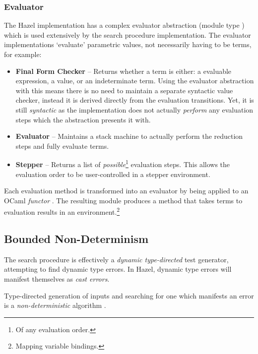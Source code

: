\subsubsection{Evaluator}\label{sec:HazelEvaluator}
The Hazel implementation has a complex evaluator abstraction (module type ) which is used extensively by the search procedure implementation. The evaluator implementations `evaluate' parametric values, not necessarily having to be terms, for example:
\begin{itemize}
\item \textbf{Final Form Checker} -- Returns whether a term is either: a evaluable expression, a value, or an indeterminate term. Using the evaluator abstraction with this means there is no need to maintain a separate syntactic value checker, instead it is derived directly from the evaluation transitions. Yet, it is still \textit{syntactic} as the implementation does not actually \textit{perform} any evaluation steps which the abstraction presents it with.
\item \textbf{Evaluator} -- Maintains a stack machine to actually perform the reduction steps and fully evaluate terms.
\item \textbf{Stepper} -- Returns a list of \textit{possible}\footnote{Of any evaluation order.} evaluation steps. This allows the evaluation order to be user-controlled in a stepper environment.
\end{itemize}
Each evaluation method is transformed into an evaluator by being applied to an OCaml \textit{functor} \cite[ch. 10]{RealWorldOCaml}. The resulting module produces a  method that takes terms to evaluation results in an environment.\footnote{Mapping variable bindings.}


\subsection{Bounded Non-Determinism}\label{sec:Nondeterminism}
The search procedure \cite{SearchProc} is effectively a \textit{dynamic type-directed} test generator, attempting to find dynamic type errors. In Hazel, dynamic type errors will manifest themselves as \textit{cast errors}.

Type-directed generation of inputs and searching for one which manifests an error is a \textit{non-deterministic} algorithm \cite{NondeterministicAlgorithms}. 

